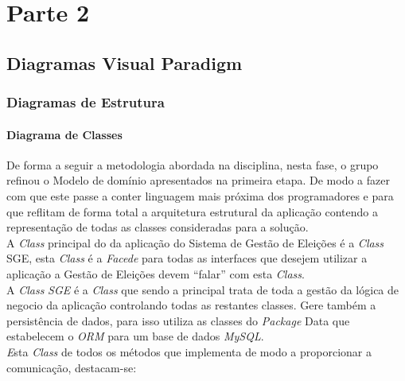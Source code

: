 \documentclass[a4paper,12pt]{report}
\begin{document}
\chapter{Parte 2}
\section{Diagramas Visual Paradigm}
\subsection{Diagramas de Estrutura}
\subsubsection{Diagrama de Classes}
De forma a seguir a metodologia abordada na disciplina, nesta fase, o grupo refinou o Modelo de domínio apresentados na primeira etapa.
De modo a fazer com que este passe a conter linguagem mais próxima dos programadores e para que reflitam de forma total a arquitetura estrutural da aplicação contendo a representação de todas as classes consideradas para a solução.
\\\indent A \emph{Class} principal do da aplicação do Sistema de Gestão de Eleições é a \emph{Class} SGE, 
esta \emph{Class} é a \emph{Facede} para todas as interfaces que desejem utilizar a aplicação a Gestão 
de Eleições devem ``falar'' com esta \emph{Class}.
\\\indent A \emph{Class} \emph{SGE} é a \emph{Class} que sendo a principal trata de toda a gestão da lógica de 
negocio da aplicação controlando todas as restantes classes. Gere também a persistência de dados, para 
isso utiliza as classes do \emph{Package} Data que estabelecem o \emph{ORM} para um base de dados \emph{MySQL}.
\\\emph Esta \emph{Class} de todos os métodos que implementa de modo a proporcionar a comunicação, destacam-se:
\end{document}
